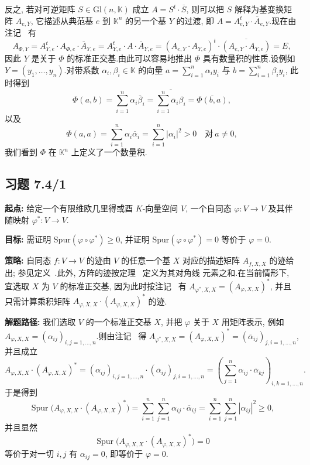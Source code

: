 反之, 若对可逆矩阵 $S \in \mathrm{Gl}(n, \mathbb{K})$ 成立 $A = S^t \cdot \overline{S}$, 则可以把 $S$
解释为基变换矩阵 $A_{e, Y}$, 它描述从典范基 $e$ 到 $\mathbb{K}^n$ 的另一个基 $Y$ 的过渡, 即
$A = A_{e, Y}^t \cdot \overline{A}_{e, Y}$.现在由注记~ 有
\[
A_{\varPhi, Y} = A_{Y, e}^t \cdot A_{\varPhi, e} \cdot \overline{A}_{Y, e} = A_{Y, e}^t \cdot A \cdot \overline{A}_{Y, e} = (A_{e, Y} \cdot A_{Y, e})^t \cdot \overline{(A_{e, Y} \cdot A_{Y, e})} = E,
\]
因此 $Y$ 是关于 $\varPhi$ 的标准正交基.由此可以容易地推出 $\varPhi$ 具有数量积的性质.设例如
$Y = (y_1, \ldots, y_n)$.对带系数 $\alpha_i, \beta_i \in \mathbb{K}$ 的向量
$a = \sum_{i = 1}^{n} \alpha_i y_i$ 与 $b = \sum_{i = 1}^{n} \beta_i y_i$, 此时得到
\[
\varPhi(a, b) = \sum_{i = 1}^{n} \alpha_i \overline{\beta}_i = \overline{\sum_{i = 1}^{n} \overline{\alpha}_i \beta_i} = \overline{\varPhi(b, a)},
\]
以及
\[
\varPhi(a, a) = \sum_{i = 1}^{n} \alpha_i \overline{\alpha}_i = \sum_{i = 1}^{n} |\alpha_i|^2 > 0 \quad \text{对} \ a \neq 0,
\]
我们看到 $\varPhi$ 在 $\mathbb{K}^n$ 上定义了一个数量积.

\subsection*{习题 7.4/1}

\noindent\textbf{起点:} 给定一个有限维欧几里得或酉 $K$-向量空间 $V$, 一个自同态
$\varphi \colon V \longrightarrow V$ 及其伴随映射 $\varphi^* \colon V \longrightarrow V$.

\noindent\textbf{目标:} 需证明 $\mathrm{Spur}(\varphi \circ \varphi^*) \geq 0$, 并证明
$\mathrm{Spur}(\varphi \circ \varphi^*) = 0$ 等价于 $\varphi = 0$.

\noindent\textbf{策略:} 自同态 $f \colon V \longrightarrow V$ 的迹由 $V$ 的任意一个基 $X$ 对应的描述矩阵
$A_{f, X, X}$ 的迹给出; 参见定义~.此外, 方阵的迹按定理~ 定义为其对角线
元素之和.在当前情形下, 宜选取 $X$ 为 $V$ 的标准正交基, 因为此时按注记~ 有
$A_{\varphi^*, X, X} = (A_{\varphi, X, X})^*$, 并且只需计算乘积矩阵
$A_{\varphi, X, X} \cdot (A_{\varphi, X, X})^*$ 的迹.

\noindent\textbf{解题路径:} 我们选取 $V$ 的一个标准正交基 $X$, 并把 $\varphi$ 关于 $X$ 用矩阵表示, 例如
$A_{\varphi, X, X} = (\alpha_{ij})_{i, j = 1, \ldots, n}$.则由注记~ 得
$A_{\varphi^*, X, X} = (A_{\varphi, X, X})^* = (\overline{\alpha}_{ij})_{j, i = 1, \ldots, n}$, 并且成立
\[
A_{\varphi, X, X} \cdot (A_{\varphi, X, X})^* = (\alpha_{ij})_{i, j = 1, \ldots, n} \cdot (\overline{\alpha}_{ij})_{j, i = 1, \ldots, n} = \left( \sum_{j = 1}^{n} \alpha_{ij} \cdot \overline{\alpha}_{kj} \right)_{i, k = 1, \ldots, n}\text{.}
\]
于是得到
\[
\operatorname{Spur}\bigl(A_{\varphi, X, X} \cdot (A_{\varphi, X, X})^*\bigr) = \sum_{i = 1}^{n} \sum_{j = 1}^{n} \alpha_{ij} \cdot \overline{\alpha}_{ij} = \sum_{i = 1}^{n} \sum_{j = 1}^{n} |\alpha_{ij}|^2 \geq 0,
\]
并且显然
\[
\operatorname{Spur}\bigl(A_{\varphi, X, X} \cdot (A_{\varphi, X, X})^*\bigr) = 0
\]
等价于对一切 $i, j$ 有 $\alpha_{ij} = 0$, 即等价于 $\varphi = 0$.

